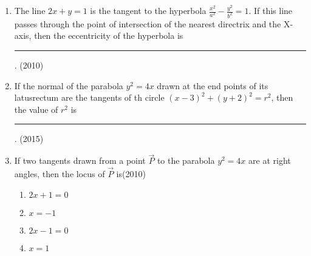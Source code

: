 	\begin{enumerate}
\item The line $2x+y=1$ is the tangent to the hyperbola $\frac{x^2}{a^2}-\frac{y^2}{b^2}=1$. If this line passes through the point of intersection of the nearest directrix and the X-axis, then the eccentricity of the hyperbola is
\rule{1cm}{0.1pt}.
\hfill(2010)
\iffalse
\item A Vertical line passing through point $(h,0)$ intersects the ellipse   at the points  $\Vec{P}$ and $\Vec{Q}$. Let the tangents to the ellipse at $\Vec{P}$ and $\Vec{Q}$ meet at the points $\Vec{R}$. If $\Delta(h)$= area of the triangle $PQR$, $\Delta_1$= ma
then 
\hfill(2013)
\begin{multicols}{2}
\begin{enumerate}
    \item $g(x)$ is continuous but not differentiable at a
    \item $g(x)$ is differentiable on R
    \item $g(x)$ is continuous but not differentiable at b
    \item $g(x)$ is continuous and differentiable either(a) or (b) but not both 
    \end{enumerate}
\end{multicols}
    \fi
\item If the normal of the parabola $y^2=4x$ drawn at the end points of its latusrectum are the tangents of th circle $(x-3)^2+(y+2)^2=r^2$, then the value of $r^2$ is \rule{1cm}{0.1pt}.
\hfill(2015)
\iffalse
\item Suppose that the focii of the ellipse $\frac{x^2}{9}+\frac{y^2}{5}=1$ are $(f_1,0)$ and ($f_2$,0) where $f_1>0$ and $f_1<0$.Let $P_1$ and $P_2$ be two parabolas with a common vertex at $(0,0)$ and with foci at ($f_1$,0) and (2$f_2$,0),respectively. Let $T_1$ be a tangent to $P_1$ which passes through (2$f_2$,0) and $T_2$ be a tangent to $P_2$ which passes through ($f_1$,0).If $m_1$ is the slope of $T_1$ and $m_2$ is the slope of $T_2$,then the value of
\hfill(2015)
\fi
\item If two tangents drawn from a point $\vec{P}$ to the parabola $y^2=4x$ are at right angles, then the locus of $\vec{P}$ is\hfill(2010)
\begin{multicols}{4}
\begin{enumerate}
    \item $2x+1=0$
    \item $x=-1$
    \item $2x-1=0$
    \item $x=1$

\end{enumerate}
\end{multicols}
\end{enumerate}
